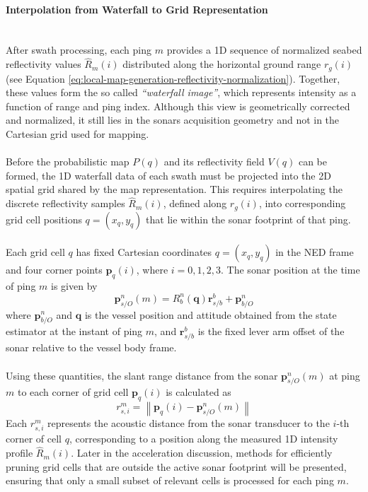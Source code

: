 \paragraph{Interpolation from Waterfall to Grid Representation} \mbox{}\\[0.5em] \noindent
After swath processing, each ping $m$ provides a 1D sequence of normalized seabed reflectivity values $\hat{R}_m(i)$ distributed along the horizontal ground range $r_g(i)$ (see Equation \ref{eq:local-map-generation-reflectivity-normalization}). Together, these values form the so called \textit{``waterfall image''}, which represents intensity as a function of range and ping index. Although this view is geometrically corrected and normalized, it still lies in the sonars acquisition geometry and not in the Cartesian grid used for mapping.  
\\ \\
Before the probabilistic map $P(q)$ and its reflectivity field $V(q)$ can be formed, the 1D waterfall data of each swath must be projected into the 2D spatial grid shared by the map representation. This requires interpolating the discrete reflectivity samples $\hat{R}_m(i)$, defined along $r_g(i)$, into corresponding grid cell positions $q=(x_q,y_q)$ that lie within the sonar footprint of that ping.
\\ \\
Each grid cell $q$ has fixed Cartesian coordinates $q=(x_q, y_q)$ in the NED frame and four corner points $\mathbf{p}_q(i)$, where $i=0,1,2,3$. The sonar position at the time of ping $m$ is given by
$$
    \mathbf{p}_{s/O}^{n}(m) = R_b^n(\mathbf{q})\mathbf{r}_{s/b}^{b} + \mathbf{p}_{b/O}^{n}
$$
where $\mathbf{p}_{b/O}^{n}$ and $\mathbf{q}$ is the vessel position and attitude obtained from the state estimator at the instant of ping $m$, and $\mathbf{r}_{s/b}^{b}$ is the fixed lever arm offset of the sonar relative to the vessel body frame. 
\\ \\ 
Using these quantities, the slant range distance from the sonar $\mathbf{p}_{s/O}^{n}(m)$ at ping $m$ to each corner of grid cell $\mathbf{p}_q(i)$ is calculated as
$$
    r_{s,i}^m = \left\| \mathbf{p}_q(i) - \mathbf{p}_{s/O}^{n}(m) \right\|
$$
Each $r_{s,i}^m$ represents the acoustic distance from the sonar transducer to the $i$-th corner of cell $q$, corresponding to a position along the measured 1D intensity profile $\hat{R}_m(i)$. Later in the acceleration discussion, methods for efficiently pruning grid cells that are outside the active sonar footprint will be presented, ensuring that only a small subset of relevant cells is processed for each ping $m$.
